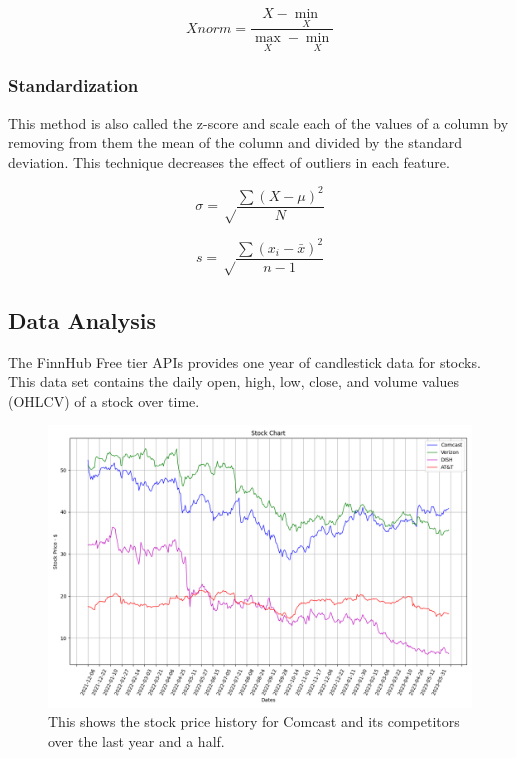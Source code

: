 \documentclass[conference]{IEEEtran}
\begin{document}
\begin{equation}
Xnorm = \frac{X - \min_{X}}{\max_{X} - \min_{X}}
\end{equation}

\subsubsection{Standardization}

This method is also called the z-score and scale each of the values of a column by removing from them the mean of the column and divided by the standard deviation.
This technique decreases the effect of outliers in each feature.

\begin{equation}
\sigma = \sqrt\frac{\sum{(X-\mu)^2}}{N}
\end{equation}


\begin{equation}
s = \sqrt\frac{\sum{(x_i-\bar{x})^2}}{n-1}
\end{equation}


\subsection{Data Analysis}

The FinnHub Free tier APIs provides one year of candlestick data for stocks.
This data set contains the daily open, high, low, close, and volume values (OHLCV) of a stock over time.

\begin{figure}
    \includegraphics[width=\columnwidth]{stock_chart}
    \caption{This shows the stock price history for Comcast and its competitors over the last year and a half.}
\end{figure}
\end{document}
